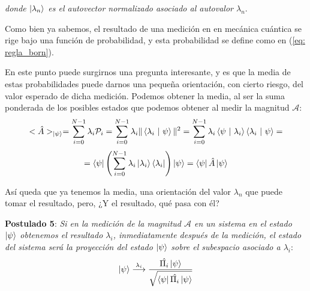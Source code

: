 \documentclass{article}
\numberwithin{equation}{section} %
\begin{document}
    \textit{donde \( \ket{\lambda_{n}} \) es el autovector normalizado asociado al autovalor \( \lambda_{n} \)}.
    
    \vspace{5mm}

    Como bien ya sabemos, el resultado de una medición en en mecánica cuántica se rige bajo una función de probabilidad, y esta probabilidad se define como en (\ref{eq: regla_born}).

    \vspace{5mm}

    En este punto puede surgirnos una pregunta interesante, y es que la media de estas probabilidades puede darnos una pequeña orientación, con cierto riesgo, del valor esperado de dicha medición. Podemos obtener la media, al ser la suma ponderada de los posibles estados que podemos obtener al medir la magnitud \( \mathcal{A} \):
    \begin{equation*}
        < \hat{A} >_{\ket{\psi}} = \sum_{i = 0}^{N - 1} \lambda_{i} \mathcal{P}_{i} = \sum_{i = 0}^{N - 1} \lambda_{i} \| \braket{\lambda_{i} \ | \ \psi} \| ^ {2} = \sum_{i = 0}^{N - 1} \lambda_{i} \braket{\psi \ | \ \lambda_{i}} \braket{\lambda_{i} \ | \ \psi} =
    \end{equation*}
    \begin{equation*}
        = \bra{\psi} \left( \sum_{i = 0}^{N - 1} \lambda_{i} \ket{\lambda_{i}} \bra{\lambda_{i}} \right) \ket{\psi} = \bra{\psi} \hat{A} \ket{\psi}
    \end{equation*}

    \vspace{1.5mm}

    Así queda que ya tenemos la media, una orientación del valor \( \lambda_{n} \) que puede tomar el resultado, pero, ¿Y el resultado, qué pasa con él?

    \vspace{10mm}

    \textbf{Postulado 5}: \textit{Si en la medición de la magnitud \( \mathcal{A} \) en un sistema en el estado \( \ket{\psi} \) obtenemos el resultado \( \lambda_{i} \), inmediatamente después de la medición, el estado del sistema será la proyección del estado \( \ket{\psi} \) sobre el subespacio asociado a \( \lambda_{i} \)}:
    \begin{equation}
        \ket{\psi} \overset{\lambda_{i}}{\longrightarrow} \frac{\hat{\Pi_{i}} \ket{\psi}}{\sqrt{\bra{\psi} \hat{\Pi_{i}} \ket{\psi}}}
    \end{equation}
\end{document}
